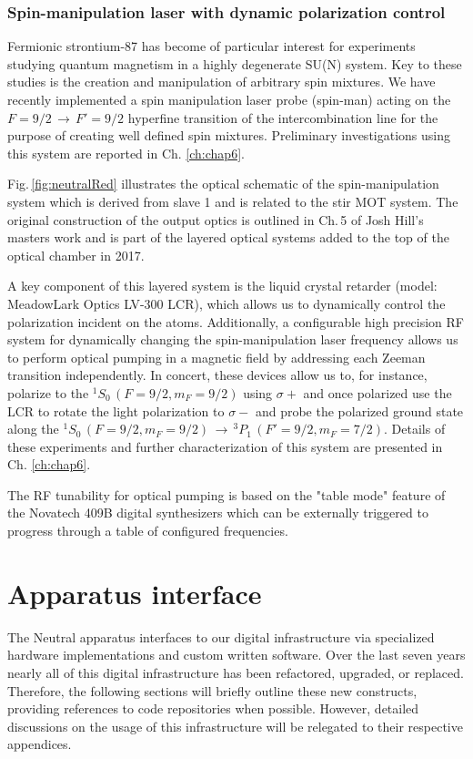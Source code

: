 \subsubsection{Spin-manipulation laser with dynamic polarization control}
Fermionic strontium-87 has become of particular interest for experiments studying quantum magnetism in a highly degenerate SU(N) system.
Key to these studies is the creation and manipulation of arbitrary spin mixtures.
We have recently implemented a spin manipulation laser probe (spin-man) acting on the $F=9/2\,\rightarrow\,F'=9/2$ hyperfine transition of the intercombination line for the purpose of creating well defined spin mixtures.
Preliminary investigations using this system are reported in Ch. \ref{ch:chap6}.

Fig.\,\ref{fig:neutralRed} illustrates the optical schematic of the spin-manipulation system which is derived from slave 1 and is related to the stir MOT system.
The original construction of the output optics is outlined in Ch.\,5 of Josh Hill's masters work \cite{Hill2017} and is part of the layered optical systems added to the top of the optical chamber in 2017.

A key component of this layered system is the liquid crystal retarder (model: MeadowLark Optics LV-300 LCR), which allows us to dynamically control the polarization incident on the atoms.
Additionally, a configurable high precision RF system for dynamically changing the spin-manipulation laser frequency allows us to perform optical pumping in a magnetic field by addressing each Zeeman transition independently.
In concert, these devices allow us to, for instance, polarize to the $^1S_0\,(F=9/2, m_F=9/2)$ using $\sigma+$ and once polarized use the LCR to rotate the light polarization to $\sigma-$ and probe the polarized ground state along the $^1S_0\,(F=9/2,m_F=9/2)\,\rightarrow\,^3P_1\,(F'=9/2,m_F=7/2)$.
Details of these experiments and further characterization of this system are presented in Ch. \ref{ch:chap6}.

The RF tunability for optical pumping is based on the "table mode" feature of the Novatech 409B digital synthesizers which can be externally triggered to progress through a table of configured frequencies.

\newpage
\section{Apparatus interface} \label{sec:electronics}
\setcounter{footnote}{0}
The Neutral apparatus interfaces to our digital infrastructure via specialized hardware implementations and custom written software.
Over the last seven years nearly all of this digital infrastructure has been refactored, upgraded, or replaced.
Therefore, the following sections will briefly outline these new constructs, providing references to code repositories when possible.
However, detailed discussions on the usage of this infrastructure will be relegated to their respective appendices.

